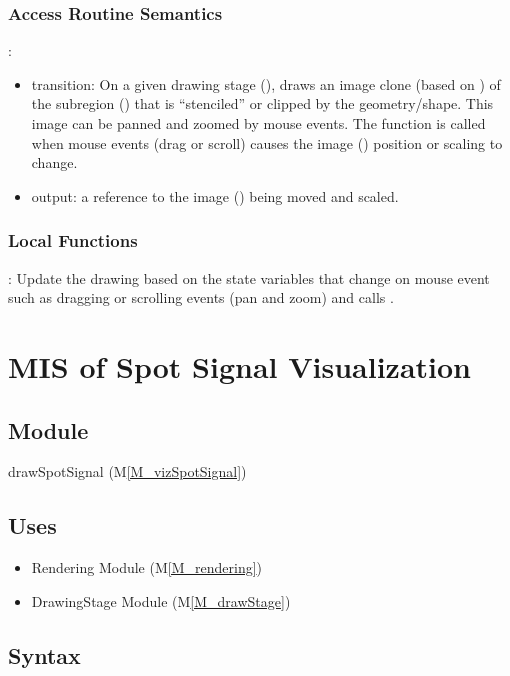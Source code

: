 \documentclass[12pt, titlepage]{article}
\newcommand{\mref}[1]{M\ref{#1}}
\newcommand{\mrefp}[1]{(\mref{#1})}
\newcommand{\mreff}[1]{Module \mrefp{#1}}
\begin{document}
\subsubsection{Access Routine Semantics}

\noindent {}:
\begin{itemize}
\item transition: On a given drawing stage (),
  draws an image clone (based on ) of the subregion ()
  that is ``stenciled'' or clipped by the  geometry/shape.
  This image can be panned and zoomed by mouse events.
  The  function is called when mouse events
  (drag or scroll) causes the image () position or scaling to change.
\item output: a reference to the image () being moved and scaled.
\end{itemize}

\subsubsection{Local Functions}
: Update the drawing based on the state variables that change on mouse event
  such as dragging or scrolling events (pan and zoom) and calls .

\newpage



\section{MIS of Spot Signal Visualization} \label{MS_vizSpotSignal}

\subsection{Module}
drawSpotSignal \mrefp{M_vizSpotSignal}

\subsection{Uses}
\begin{itemize}
  \item Rendering \mreff{M_rendering}
  \item DrawingStage \mreff{M_drawStage}
\end{itemize}

\subsection{Syntax}
\end{document}
